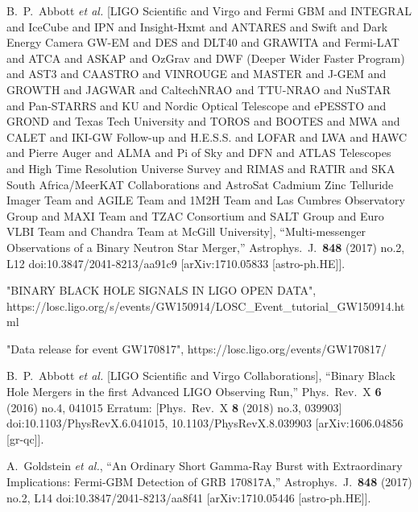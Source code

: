 \documentclass[12pt]{article}
\begin{document}
\begin{thebibliography}{99}
  B.~P.~Abbott {\it et al.} [LIGO Scientific and Virgo and Fermi GBM and INTEGRAL and IceCube and IPN and Insight-Hxmt and ANTARES and Swift and Dark Energy Camera GW-EM and DES and DLT40 and GRAWITA and Fermi-LAT and ATCA and ASKAP and OzGrav and DWF (Deeper Wider Faster Program) and AST3 and CAASTRO and VINROUGE and MASTER and J-GEM and GROWTH and JAGWAR and CaltechNRAO and TTU-NRAO and NuSTAR and Pan-STARRS and KU and Nordic Optical Telescope and ePESSTO and GROND and Texas Tech University and TOROS and BOOTES and MWA and CALET and IKI-GW Follow-up and H.E.S.S. and LOFAR and LWA and HAWC and Pierre Auger and ALMA and Pi of Sky and DFN and ATLAS Telescopes and High Time Resolution Universe Survey and RIMAS and RATIR and SKA South Africa/MeerKAT Collaborations and AstroSat Cadmium Zinc Telluride Imager Team and AGILE Team and 1M2H Team and Las Cumbres Observatory Group and MAXI Team and TZAC Consortium and SALT Group and Euro VLBI Team and Chandra Team at McGill University],
  ``Multi-messenger Observations of a Binary Neutron Star Merger,''
  Astrophys.\ J.\  {\bf 848} (2017) no.2,  L12
  doi:10.3847/2041-8213/aa91c9
  [arXiv:1710.05833 [astro-ph.HE]].

  "BINARY BLACK HOLE SIGNALS IN LIGO OPEN DATA",
  {https://losc.ligo.org/s/events/GW150914/LOSC\_Event\_tutorial\_GW150914.html}
  
  "Data release for event GW170817",
  {https://losc.ligo.org/events/GW170817/}
  
  B.~P.~Abbott {\it et al.} [LIGO Scientific and Virgo Collaborations],
  ``Binary Black Hole Mergers in the first Advanced LIGO Observing Run,''
  Phys.\ Rev.\ X {\bf 6} (2016) no.4,  041015
   Erratum: [Phys.\ Rev.\ X {\bf 8} (2018) no.3,  039903]
  doi:10.1103/PhysRevX.6.041015, 10.1103/PhysRevX.8.039903
  [arXiv:1606.04856 [gr-qc]].

  A.~Goldstein {\it et al.},
  ``An Ordinary Short Gamma-Ray Burst with Extraordinary Implications: Fermi-GBM Detection of GRB 170817A,''
  Astrophys.\ J.\  {\bf 848} (2017) no.2,  L14
  doi:10.3847/2041-8213/aa8f41
  [arXiv:1710.05446 [astro-ph.HE]].


\end{thebibliography}
\end{document}
